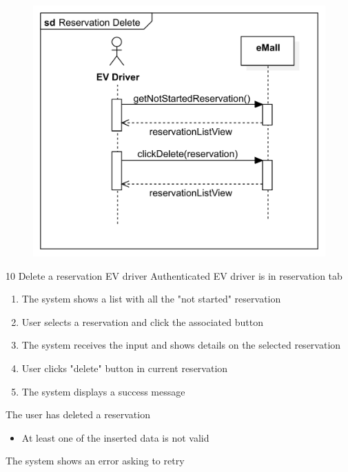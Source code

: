 \usecase
{
    \begin{figure}[H]
        \centering
        \includegraphics[scale=0.9]{src/sequence_diagram/deleteReservation.png}
    \end{figure}
}
{10}
{Delete a reservation}
{EV driver}
{Authenticated EV driver is in reservation tab}
{
    \begin{enumerate}
        \item The system shows a list with all the "not started" reservation
        \item User selects a reservation and click the associated button
        \item The system receives the input and shows details on the selected reservation
        \item User clicks "delete" button in current reservation
        \item The system displays a success message
    \end{enumerate}
}
{The user has deleted a reservation}
{
    \begin{itemize}
        \item At least one of the inserted data is not valid
    \end{itemize}
}
{
    The system shows an error asking to retry
}

